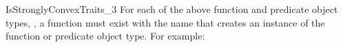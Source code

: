 \begin{ccRefConcept}{IsStronglyConvexTraits_3}
For each of the above function and predicate object types,
, a function must exist with the name
 that creates an instance of the function or
predicate object type.  For example:

\ccAutoIndexingOn

\ccHasModels
{} \\

\ccSeeAlso

\\

\end{ccRefConcept}

